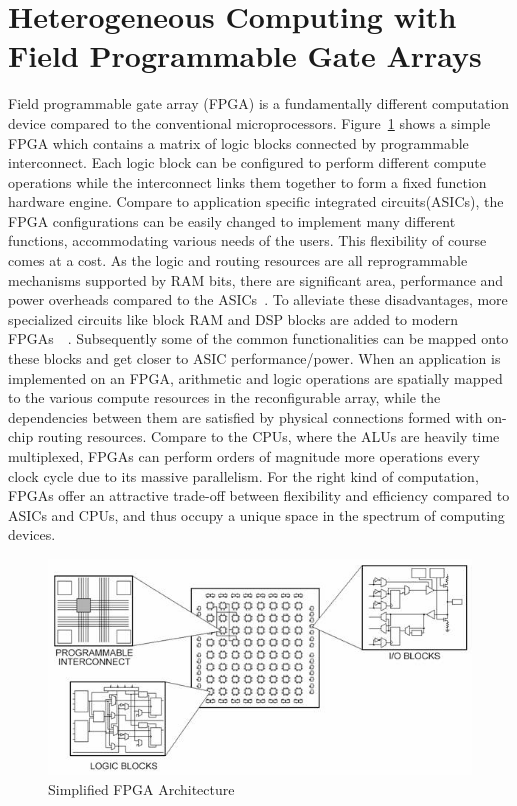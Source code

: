 \section{Heterogeneous Computing with Field Programmable Gate Arrays}
\label{chap1:het}
Field programmable gate array (FPGA) is a fundamentally different computation device
compared to the conventional microprocessors. Figure~\ref{fig:fpgaArch}
shows a simple FPGA which contains a matrix
of logic blocks connected by programmable interconnect. Each logic block
can be configured to perform different compute operations while the interconnect links them together to form a fixed function hardware engine.
Compare to application specific integrated circuits(ASICs), the FPGA configurations can be easily changed to implement many different functions,
accommodating various needs of the users.
This flexibility of course comes at a cost. As the logic and
routing resources are all reprogrammable mechanisms supported by RAM bits, there are significant
area, performance and power overheads compared to the ASICs~\cite{4068926}. To alleviate these disadvantages, 
more specialized circuits like block RAM and DSP blocks are added to modern
FPGAs~\cite{chips:virtex5}~\cite{chips:arria}. Subsequently some of the common functionalities can be mapped onto
these blocks and get closer to ASIC performance/power. When an application
is implemented on an FPGA, arithmetic and logic operations are spatially mapped to
the various compute resources in the reconfigurable array, while the dependencies between them
are satisfied by physical connections formed with on-chip routing resources. Compare to the CPUs, where the ALUs are heavily time
multiplexed, FPGAs can perform orders of magnitude more operations every clock cycle due to its
massive parallelism. For the right kind of computation, FPGAs offer an attractive
trade-off between flexibility and efficiency compared to ASICs and CPUs, and
thus occupy a unique space in the spectrum of computing devices.



\begin{figure}[htp]
\begin{center}
\includegraphics[width=0.8\linewidth]{chap1fig/archsim.jpg}
\caption{Simplified FPGA Architecture~\cite{}
\label{fig:fpgaArch}}
\end{center}
\end{figure}


